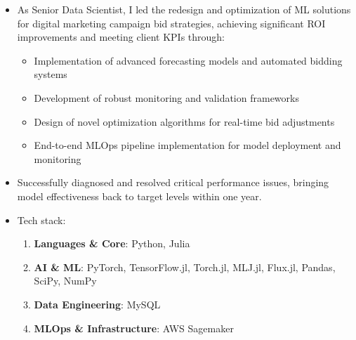 {  
  \begin{itemize}
    \item As Senior Data Scientist, I led the redesign and optimization of ML solutions for digital marketing campaign bid strategies, achieving significant ROI improvements and meeting client KPIs through:
      \begin{itemize}
        \item Implementation of advanced forecasting models and automated bidding systems
        \item Development of robust monitoring and validation frameworks
        \item Design of novel optimization algorithms for real-time bid adjustments
        \item End-to-end MLOps pipeline implementation for model deployment and monitoring
      \end{itemize}
    \item Successfully diagnosed and resolved critical performance issues, bringing model effectiveness back to target levels within one year.
    \item Tech stack:
      \begin{enumerate}
        \item \textbf{Languages \& Core}: {\color{accent2}Python, Julia}
        \item \textbf{AI \& ML}: {\color{accent2}PyTorch, TensorFlow.jl, Torch.jl, MLJ.jl, Flux.jl, Pandas, SciPy, NumPy}
        \item \textbf{Data Engineering}: {\color{accent2}MySQL}
        \item \textbf{MLOps \& Infrastructure}: {\color{accent2}AWS Sagemaker}
      \end{enumerate}
  \end{itemize}

  \divider

}
